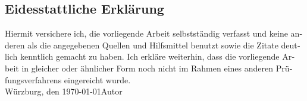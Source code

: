 \newpage
\begin{otherlanguage}{ngerman}
\thispagestyle{empty}
\section*{Eidesstattliche Erklärung}
\thispagestyle{empty}
Hiermit versichere ich, die vorliegende Arbeit selbstständig verfasst und keine anderen als die angegebenen Quellen und Hilfsmittel benutzt sowie die Zitate deutlich kenntlich gemacht zu haben.
\newline
Ich erkläre weiterhin, dass die vorliegende Arbeit in gleicher oder ähnlicher Form noch nicht im Rahmen eines
anderen Prüfungsverfahrens eingereicht wurde.
\vspace{4\baselineskip}\\
Würzburg, den \today \hfill Autor
\vspace{4\baselineskip}\\
\end{otherlanguage}
